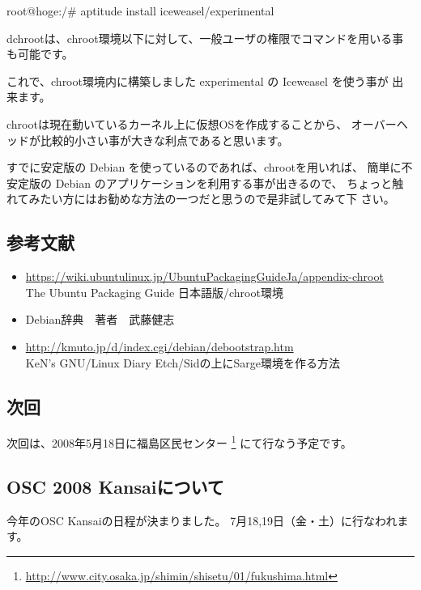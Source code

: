 \documentclass[mingoth,a4paper]{jsarticle}
\begin{document}
\begin{commandline}
root@hoge:/# aptitude install iceweasel/experimental
\end{commandline}

dchrootは、chroot環境以下に対して、一般ユーザの権限でコマンドを用いる事
も可能です。


これで、chroot環境内に構築しました experimental の Iceweasel を使う事が
出来ます。

chrootは現在動いているカーネル上に仮想OSを作成することから、
オーバーヘッドが比較的小さい事が大きな利点であると思います。

すでに安定版の Debian を使っているのであれば、chrootを用いれば、
簡単に不安定版の Debian のアプリケーションを利用する事が出きるので、
ちょっと触れてみたい方にはお勧めな方法の一つだと思うので是非試してみて下
さい。

\subsection{参考文献}

\begin{itemize}
\item \url{https://wiki.ubuntulinux.jp/UbuntuPackagingGuideJa/appendix-chroot} \\ The Ubuntu Packaging Guide 日本語版/chroot環境
\item Debian辞典　著者　武藤健志
\item \url{http://kmuto.jp/d/index.cgi/debian/debootstrap.htm} \\ KeN's
      GNU/Linux Diary Etch/Sidの上にSarge環境を作る方法
\end{itemize}


\subsection{次回}
次回は、2008年5月18日に福島区民センター
\footnote{\url{http://www.city.osaka.jp/shimin/shisetu/01/fukushima.html}}
にて行なう予定です。

\subsection{OSC 2008 Kansaiについて}
今年のOSC Kansaiの日程が決まりました。
7月18,19日（金・土）に行なわれます。
\end{document}
